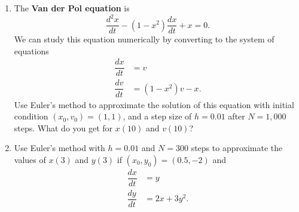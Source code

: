 \documentclass[10pt]{article}
\begin{document}
\begin{enumerate}
\setcounter{enumi}{\theenumCount}
\item The \textbf{Van der Pol equation} is 
$$\dfrac{d^2 x}{dt} - (1-x^2) \dfrac{dx}{dt} + x = 0.$$
We can study this equation numerically by converting to the system of equations
\begin{align*}
\dfrac{dx}{dt} &= v \\ 
\dfrac{dv}{dt} &= (1-x^2)v - x.
\end{align*}
Use Euler's method to approximate the solution of this equation with initial condition $(x_0,v_0) = (1,1)$, and a step size of $h = 0.01$ after $N = 1{,}000$ steps.  What do you get for $x(10)$ and $v(10)$?  
\vfill




\item Use Euler's method with $h = 0.01$ and $N = 300$ steps to approximate the values of $x(3)$ and $y(3)$ if $(x_0, y_0) = (0.5,-2)$ and 
\begin{align*}
\dfrac{dx}{dt} &=  y \\ 
\dfrac{dy}{dt} &= 2x + 3y^2.
\end{align*}
\vfill

\end{enumerate}
\end{document}
